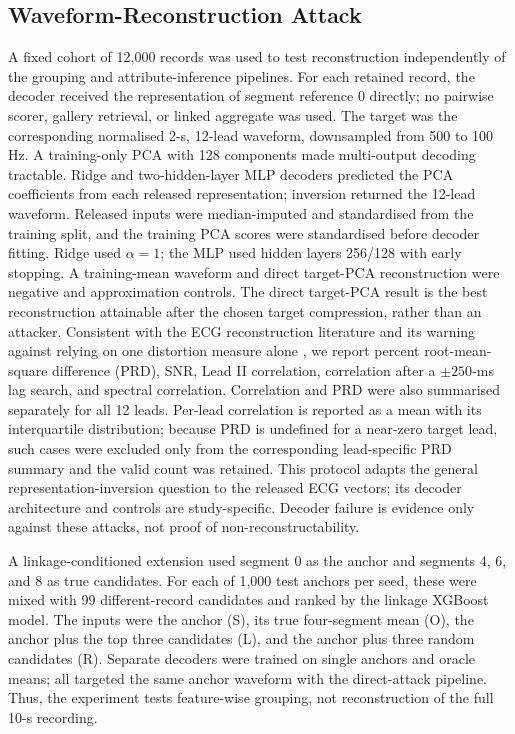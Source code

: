 \documentclass[journal]{IEEEtran}
\begin{document}
\subsection{Waveform-Reconstruction Attack}
\label{subsec:reconstruction-attack}

A fixed cohort of 12,000 records was used to test reconstruction independently
of the grouping and attribute-inference pipelines. For each retained record,
the decoder received the representation of segment reference 0 directly; no
pairwise scorer, gallery retrieval, or linked aggregate was used. The target
was the corresponding normalised 2-s, 12-lead waveform, downsampled from 500
to 100 Hz. A training-only PCA with
128 components made multi-output decoding tractable. Ridge and two-hidden-layer
MLP decoders predicted the PCA coefficients from each released
representation; inversion returned the 12-lead waveform. Released inputs were
median-imputed and standardised from the training split, and the training PCA
scores were standardised before decoder fitting. Ridge used $\alpha=1$; the
MLP used hidden layers 256/128 with early stopping. A training-mean
waveform and direct target-PCA reconstruction were negative and approximation
controls. The direct target-PCA result is the best reconstruction attainable
after the chosen target compression, rather than an attacker. Consistent with
the ECG reconstruction literature and its
warning against relying on one distortion measure alone
\cite{BlancoVelasco2005ECGPRD,Nemcova2018ECGQuality}, we report percent
root-mean-square difference (PRD), SNR, Lead II correlation, correlation after
a $\pm250$-ms lag search, and spectral correlation. Correlation and PRD were
also summarised separately for all 12 leads. Per-lead correlation is reported
as a mean with its interquartile distribution; because PRD is undefined for a
near-zero target lead, such cases were excluded only from the corresponding
lead-specific PRD summary and the valid count was retained. This protocol
adapts the general representation-inversion question to the released ECG
vectors; its decoder architecture and controls are study-specific. Decoder
failure is evidence only against these attacks, not proof of
non-reconstructability.

A linkage-conditioned extension used segment 0 as the anchor and segments 4,
6, and 8 as true candidates. For each of 1,000 test anchors per seed, these were
mixed
with 99 different-record candidates and ranked by the linkage XGBoost model.
The inputs were the anchor (S), its true four-segment mean (O), the anchor plus
the top three candidates (L), and the anchor plus three random candidates (R).
Separate decoders were trained on single anchors and oracle means; all targeted
the same anchor waveform with the direct-attack pipeline. Thus, the experiment
tests feature-wise grouping, not reconstruction of the full 10-s recording.
\end{document}
